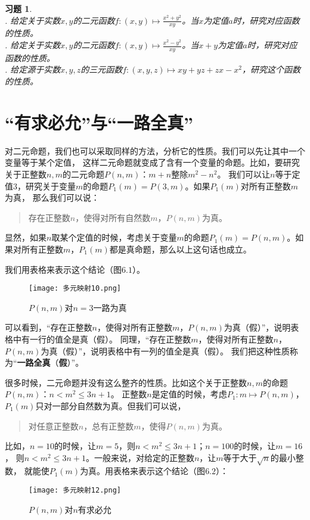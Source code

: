 \documentclass[12pt,UTF8]{ctexbook}
\newtheorem{xt}{习题}[section]
\begin{document}
\begin{xt}
    \mbox{} \\
    . 给定关于实数$x, y$的二元函数$f: (x, y) \mapsto \frac{x^2 + y^2}{xy}$。当$x$为定值$a$时，研究对应函数的性质。\\
    . 给定关于实数$x, y$的二元函数$f: (x, y) \mapsto \frac{x^2 - y^2}{xy}$。当$x+y$为定值$a$时，研究对应函数的性质。\\
    . 给定源于实数$x,y,z$的三元函数$f:(x,y,z) \mapsto xy + yz + zx - x^2$，研究这个函数的性质。
\end{xt}


\section{“有求必允”与“一路全真”}

对二元命题，我们也可以采取同样的方法，分析它的性质。我们可以先让其中一个变量等于某个定值，
这样二元命题就变成了含有一个变量的命题。比如，要研究关于正整数$n,m$的二元命题$P(n,m)$：$m + n$整除$m^2 - n^2$。
我们可以让$n$等于定值$3$，研究关于变量$m$的命题$P_1 (m) = P(3,m)$。如果$P_1(m)$对所有正整数$m$为真，
那么我们可以说：
\begin{quotation}
    存在正整数$n$，使得对所有自然数$m$，$P(n,m)$为真。
\end{quotation}
显然，如果$n$取某个定值的时候，考虑关于变量$m$的命题$P_1 (m) = P(n,m)$。如果对所有正整数$m$，$P_1(m)$都是真命题，那么以上这句话也成立。

我们用表格来表示这个结论（图$6.1$）。

\begin{figure}[h] %
    \vspace{4pt}
    \centering
    \texttt{[image: 多元映射10.png]}
    \caption{$P(n,m)$对$n=3$一路为真}
\end{figure}

可以看到，“存在正整数$n$，使得对所有正整数$m$，$P(n,m)$为真（假）”，说明表格中有一行的值全是真（假）。
同理，“存在正整数$m$，使得对所有正整数$n$，$P(n,m)$为真（假）”，说明表格中有一列的值全是真（假）。
我们把这种性质称为“\textbf{一路全真}（\textbf{假}）”。

很多时候，二元命题并没有这么整齐的性质。比如这个关于正整数$n,m$的命题$P(n,m)$：$n < m^2 \leqslant 3n+1$。
正整数$n$是定值的时候，考虑$P_1 : m \mapsto P(n,m)$，$P_1(m)$只对一部分自然数为真。但我们可以说，
\begin{quotation}
    对任意正整数$n$，总有正整数$m$，使得$P(n,m)$为真。
\end{quotation}
比如，$n=10$的时候，让$m = 5$，则$n < m^2 \leqslant 3n+1$；$n=100$的时候，让$m = 16$，
则$n < m^2 \leqslant 3n+1$。一般来说，对给定的正整数$n$，让$m$等于大于$\sqrt{n}$的最小整数，
就能使$P_1(m)$为真。用表格来表示这个结论（图$6.2$）：
\begin{figure}[H] %
    \vspace{4pt}
    \centering
    \texttt{[image: 多元映射12.png]}
    \caption{$P(n,m)$对$n$有求必允}
\end{figure}
\end{document}
